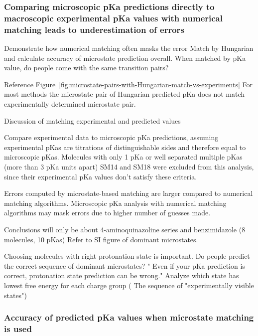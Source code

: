 \documentclass[9pt,lineno,final]{elife}
\begin{document}
\subsubsection{Comparing microscopic pKa predictions directly to macroscopic experimental pKa values with numerical matching leads to underestimation of errors}


Demonstrate how numerical matching often masks the error
Match by Hungarian and calculate accuracy of microstate prediction overall.
When matched by pKa value, do people come with the same transition pairs?

Reference Figure~\ref{fig:microstate-pairs-with-Hungarian-match-vs-experiments}  For most methods the microstate pair of Hungarian predicted pKa does not match experimentally determined microstate pair.



Discussion of matching experimental and predicted values

Compare experimental data to microscopic pKa predictions, assuming experimental pKas are titrations of distinguishable sides and therefore equal to microscopic pKas.
Molecules with only 1 pKa or well separated multiple pKas (more than 3 pKa units apart) SM14 and SM18 were excluded from this analysis, since their experimental pKa values don't satisfy these criteria.

Errors computed by microstate-based matching are larger compared to numerical matching algorithms.
Microscopic pKa analysis with numerical matching algorithms may mask errors due to higher number of guesses made.




Conclusions will only be about 4-aminoquinazoline series and benzimidazole (8 molecules, 10 pKas)
Refer to SI figure of dominant microstates.

Choosing molecules with right protonation state is important.
Do people predict the correct sequence of dominant microstates?
 " Even if your pKa prediction is correct, protonation state prediction can be wrong."
 Analyze which state has lowest free energy for each charge group ( The sequence of "experimentally visible states")



\subsubsection{Accuracy of predicted pKa values when microstate matching is used}
\end{document}
